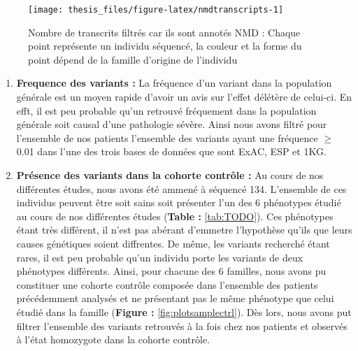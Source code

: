 \documentclass[12pt,twoside]{reedthesis}
\providecommand{\tightlist}{%
  \setlength{\itemsep}{0pt}\setlength{\parskip}{0pt}}
\theoremstyle{definition}
\theoremstyle{definition}
\theoremstyle{remark}
\begin{document}
  \begin{figure}
  
  {\centering \texttt{[image: thesis\_files/figure-latex/nmdtranscripts-1]} 
  
  }
  
  \caption[Nombre de transcrits filtrés car ils sont annotés NMD]{Nombre de transcrits filtrés car ils sont annotés NMD : Chaque point représente un individu séquencé, la couleur et la forme du point dépend de la famille d'origine de l'individu}\label{fig:nmdtranscripts}
  \end{figure}
  
  \begin{enumerate}
  \def\labelenumi{\arabic{enumi}.}
  \setcounter{enumi}{4}
  \tightlist
  \item
    \textbf{Frequence des variants :} La fréquence d'un variant dans la
    population générale est un moyen rapide d'avoir un avis sur l'effet
    délétère de celui-ci. En efft, il est peu probable qu'un retrouvé
    fréquement dans la population générale soit causal d'une pathologie
    sévère. Ainsi nous avons filtré pour l'ensemble de nos patients
    l'ensemble des variants ayant une fréquence \(\ge\) 0.01 dans l'une
    des trois bases de données que sont ExAC, ESP et 1KG.\\
  \item
    \textbf{Présence des variants dans la cohorte contrôle :} Au cours de
    nos différentes études, nous avons été ammené à séquencé 134.
    L'ensemble de ces individus peuvent être soit sains soit présenter
    l'un des 6 phénotypes étudié au cours de nos différentes études
    (\textbf{Table : }\ref{tab:TODO}). Ces phénotypes étant très
    différent, il n'est pas abérant d'emmetre l'hypothèse qu'ils que leurs
    causes génétiques soient diffrentes. De même, les variants recherché
    étant rares, il est peu probable qu'un individu porte les variants de
    deux phénotypes différents. Ainsi, pour chacune des 6 familles, nous
    avons pu constituer une cohorte contrôle composée dans l'ensemble des
    patients précédemment analysés et ne présentant pas le même phénotype
    que celui étudié dans la famille (\textbf{Figure :
    }\ref{fig:plotsamplectrl}). Dès lors, nous avons put filtrer
    l'ensemble des variants retrouvés à la fois chez nos patients et
    observés à l'état homozygote dans la cohorte contrôle.
  \end{enumerate}
  
\end{document}
